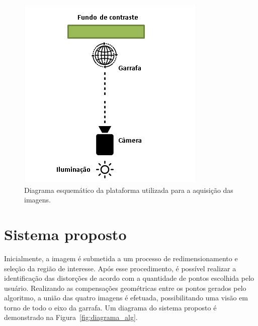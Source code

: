 \begin{figure}[htb]
    \caption{Diagrama esquemático da plataforma utilizada para a aquisição das imagens. }
    \centering
    \vspace{0.3cm}
    \begin{minipage}{.5\textwidth}
         \includegraphics[width=\textwidth]{TCC/Imagens/Esquematico_plataforma.jpg}
	\end{minipage}
    \label{fig:plat_esq}
\end{figure}

\section{Sistema proposto}

Inicialmente, a imagem é submetida a um processo de redimensionamento e seleção da região de interesse. Após esse procedimento, é possível realizar a identificação das distorções de acordo com a quantidade de pontos escolhida pelo usuário. Realizando as compensações geométricas entre os pontos gerados pelo algoritmo, a união das quatro imagens é efetuada, possibilitando uma visão em torno de todo o eixo da garrafa. Um diagrama do sistema proposto é demonstrado na Figura~\ref{fig:diagrama_alg}.


